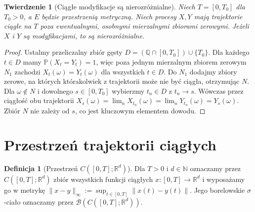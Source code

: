\documentclass[11pt,a4paper,oneside]{report}
\numberwithin{equation}{chapter}
\theoremstyle{plain}
\newtheorem{twierdzenie}{Twierdzenie}[chapter]
\theoremstyle{definition}
\newtheorem{definicja}{Definicja}[chapter]
\theoremstyle{remark}
\newcommand{\R}{\mathbb{R}}
\newcommand{\N}{\mathbb{N}}
\newcommand{\Q}{\mathbb{Q}}
\newcommand{\Prob}{\mathbb{P}}
\newcommand{\calB}{\mathcal{B}}
\newcommand{\norm}[1]{\lVert #1\rVert}
\begin{document}
\begin{twierdzenie}[Ciągłe modyfikacje są nierozróżnialne]
Niech $T=[0,T_0]$ dla $T_0>0$, a $E$ będzie przestrzenią
metryczną. Niech procesy $X,Y$ mają trajektorie ciągłe na $T$
poza ewentualnymi, osobnymi mierzalnymi zbiorami zerowymi.
Jeżeli $X$ i $Y$ są modyfikacjami, to są nierozróżnialne.
\end{twierdzenie}
\begin{proof}
Ustalmy przeliczalny zbiór gęsty
$D=(\Q\cap[0,T_0])\cup\{T_0\}$.
Dla każdego $t\in D$ mamy $\Prob(X_t=Y_t)=1$,
więc poza jednym mierzalnym zbiorem zerowym $N_1$
zachodzi $X_t(\omega)=Y_t(\omega)$ dla wszystkich $t\in D$.
Do $N_1$ dodajmy zbiory zerowe, na których którakolwiek z
trajektorii może nie być ciągła, otrzymując $N$.
Dla $\omega\notin N$ i dowolnego $s\in[0,T_0]$
wybierzmy $t_n\in D$ z $t_n\to s$.
Wówczas przez ciągłość obu trajektorii
$X_s(\omega)=\lim_n X_{t_n}(\omega)
=\lim_n Y_{t_n}(\omega)=Y_s(\omega)$.
Zbiór $N$ nie zależy od $s$, co jest kluczowym elementem dowodu.
\end{proof}

\section{Przestrzeń trajektorii ciągłych}
\begin{definicja}[{Przestrzeń $C([0,T];\R^d)$}]
Dla $T>0$ i $d\in\N$ oznaczamy przez
$C([0,T];\R^d)$ zbiór wszystkich funkcji ciągłych
$x:[0,T]\to\R^d$ i wyposażamy go w metrykę
$\norm{x-y}_\infty:=\sup_{t\in[0,T]}\norm{x(t)-y(t)}$.
Jego borelowskie $\sigma$-ciało oznaczamy przez
$\calB(C([0,T];\R^d))$.
\end{definicja}
\end{document}
